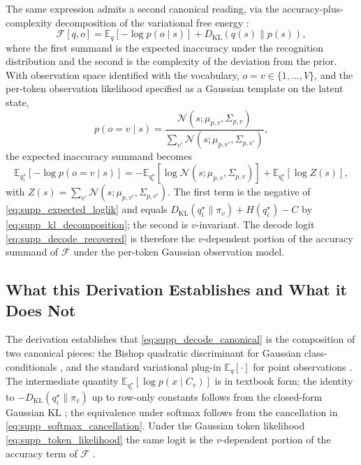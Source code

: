 \documentclass[twoside,11pt]{article}
\begin{document}
The same expression admits a second canonical reading, via the accuracy-plus-complexity decomposition of the variational free energy \cite{Friston2010,Blei2017}:
\begin{equation}
\mathcal{F}[q,o] = \mathbb{E}_{q}[-\log p(o \mid s)] + D_{\mathrm{KL}}(q(s) \| p(s)),
\label{eq:supp_form3_free_energy}
\end{equation}
where the first summand is the expected inaccuracy under the recognition distribution and the second is the complexity of the deviation from the prior. With observation space identified with the vocabulary, $o = v \in \{1,\dots,V\}$, and the per-token observation likelihood specified as a Gaussian template on the latent state,
\begin{equation}
p(o = v \mid s) = \frac{\mathcal{N}(s;\mu_{p,v}, \Sigma_{p,v})}{\sum_{v'} \mathcal{N}(s;\mu_{p,v'}, \Sigma_{p,v'})},
\label{eq:supp_token_likelihood}
\end{equation}
the expected inaccuracy summand becomes
\begin{equation}
\mathbb{E}_{q_i^{\star}}[-\log p(o = v \mid s)]
=
-\mathbb{E}_{q_i^{\star}}[\log \mathcal{N}(s;\mu_{p,v}, \Sigma_{p,v})]
+ \mathbb{E}_{q_i^{\star}}[\log Z(s)],
\end{equation}
with $Z(s) = \sum_{v'} \mathcal{N}(s;\mu_{p,v'}, \Sigma_{p,v'})$. The first term is the negative of \eqref{eq:supp_expected_loglik} and equals $D_{\mathrm{KL}}(q_i^{\star} \| \pi_v) + H(q_i^{\star}) - C$ by \eqref{eq:supp_kl_decomposition}; the second is $v$-invariant. The decode logit \eqref{eq:supp_decode_recovered} is therefore the $v$-dependent portion of the accuracy summand of $\mathcal{F}$ under the per-token Gaussian observation model.

\subsection{What this Derivation Establishes and What it Does Not}

The derivation establishes that \eqref{eq:supp_decode_canonical} is the composition of two canonical pieces: the Bishop quadratic discriminant for Gaussian class-conditionals \cite[\S4.2.1]{Bishop2006}, and the standard variational plug-in $\mathbb{E}_q[\cdot]$ for point observations \cite{Blei2017}. The intermediate quantity $\mathbb{E}_{q_i^{\star}}[\log p(x \mid C_v)]$ is in textbook form; the identity to $-D_{\mathrm{KL}}(q_i^{\star} \| \pi_v)$ up to row-only constants follows from the closed-form Gaussian KL \cite[App.~B]{Bishop2006}; the equivalence under softmax follows from the cancellation in \eqref{eq:supp_softmax_cancellation}. Under the Gaussian token likelihood \eqref{eq:supp_token_likelihood} the same logit is the $v$-dependent portion of the accuracy term of $\mathcal{F}$ \cite{Friston2010}.
\end{document}
